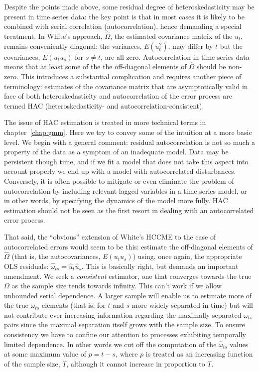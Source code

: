 Despite the points made above, some residual degree of
heteroskedasticity may be present in time series data: the key point
is that in most cases it is likely to be combined with serial
correlation (autocorrelation), hence demanding a special treatment.
In White's approach, $\hat{\Omega}$, the estimated covariance matrix
of the $u_t$, remains conveniently diagonal: the variances,
$E(u^2_t)$, may differ by $t$ but the covariances, $E(u_t u_s)$ for
$s \neq t$, are all zero.  Autocorrelation in time series data means
that at least some of the the off-diagonal elements of $\hat{\Omega}$
should be non-zero.  This introduces a substantial complication and
requires another piece of terminology: estimates of the covariance
matrix that are asymptotically valid in face of both
heteroskedasticity and autocorrelation of the error process are termed
HAC (heteroskedasticity- and autocorrelation-consistent).

The issue of HAC estimation is treated in more technical terms in
chapter~\ref{chap:gmm}.  Here we try to convey some of the intuition
at a more basic level.  We begin with a general comment: residual
autocorrelation is not so much a property of the data as a symptom of
an inadequate model.  Data may be persistent though time, and if we
fit a model that does not take this aspect into account properly we
end up with a model with autocorrelated disturbances.  Conversely, it
is often possible to mitigate or even eliminate the problem of
autocorrelation by including relevant lagged variables in a time
series model, or in other words, by specifying the dynamics of the
model more fully.  HAC estimation should not be seen as the first
resort in dealing with an autocorrelated error process.

That said, the ``obvious'' extension of White's HCCME to the case of
autocorrelated errors would seem to be this: estimate the off-diagonal
elements of $\hat{\Omega}$ (that is, the autocovariances,
$E(u_t u_s)$) using, once again, the appropriate OLS residuals:
$\hat{\omega}_{ts} = \hat{u}_t \hat{u}_s$.  This is basically right,
but demands an important amendment.  We seek a \textit{consistent}
estimator, one that converges towards the true $\Omega$ as the sample
size tends towards infinity.  This can't work if we allow unbounded
serial dependence.  A larger sample will enable us to estimate more of
the true $\omega_{ts}$ elements (that is, for $t$ and $s$ more widely
separated in time) but will not contribute ever-increasing information
regarding the maximally separated $\omega_{ts}$ pairs since the
maximal separation itself grows with the sample size.  To ensure
consistency we have to confine our attention to processes exhibiting
temporally limited dependence. In other words we cut off the
computation of the $\hat{\omega}_{ts}$ values at some maximum value of
$p = t-s$, where $p$ is treated as an increasing function of the
sample size, $T$, although it cannot increase in proportion to $T$.

